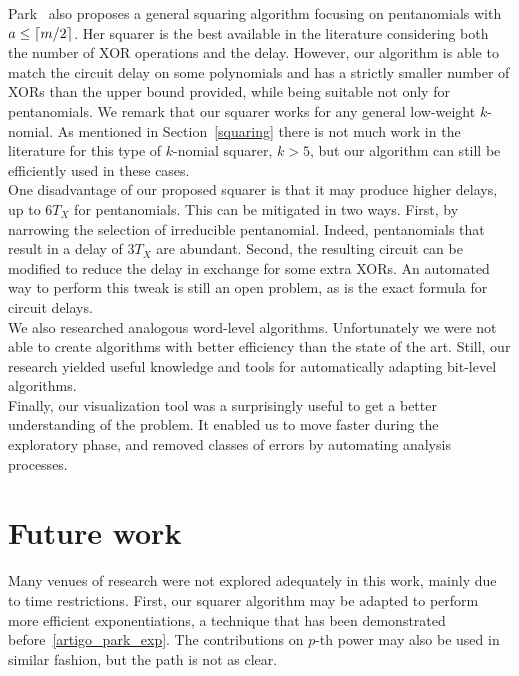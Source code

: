 Park~\cite{park2012explicit} also proposes a general squaring algorithm focusing on pentanomials with $a \leq \lceil m/2\rceil$. Her squarer is the best available in the literature considering both the number of XOR operations and the delay. However, our algorithm is able to match the circuit delay on some polynomials and has a strictly smaller number of XORs than the upper bound provided, while being suitable not only for pentanomials. 
We remark that our squarer works for any general low-weight $k$-nomial. As mentioned in Section~\ref{squaring} there is not much work in the literature for this type of $k$-nomial squarer, $k>5$, but our algorithm can still be efficiently used in these cases.\\

One disadvantage of our proposed squarer is that it may produce higher delays, up to $6 T_X$ for pentanomials. This can be mitigated in two ways. First, by narrowing the selection of irreducible pentanomial. Indeed,  pentanomials that result in a delay of $3 T_X$ are abundant. Second, the resulting circuit can be modified to reduce the delay in exchange for some extra XORs. An automated way to perform this tweak is still an open problem, as is the exact formula for circuit delays.\\

We also researched analogous word-level algorithms. Unfortunately we were not able to create algorithms with better efficiency than the state of the art. Still, our research yielded useful knowledge and tools for automatically adapting bit-level algorithms. \\

Finally, our visualization tool was a surprisingly useful to get a better understanding of the problem. It enabled us to move faster during the exploratory phase, and removed classes of errors by automating analysis processes. \\


\section{Future work}

Many venues of research were not explored adequately in this work, mainly due to time restrictions. First, our squarer algorithm may be adapted to perform more efficient exponentiations, a technique that has been demonstrated before~\ref{artigo_park_exp}. The contributions on $p$-th power may also be used in similar fashion, but the path is not as clear. \\


